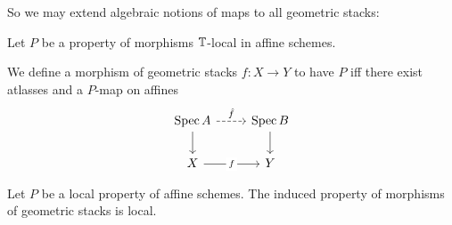 So we may extend algebraic notions of maps to all geometric stacks:
\begin{definition}
	Let $P$ be a property of morphisms $\mathbb{T}$-local in affine schemes.
	
	We define a morphism of geometric stacks $f : X \to Y$ to have $P$ iff
	there exist atlasses and a $P$-map on affines 
	\[\begin{tikzcd}
		{\Spec A} & {\Spec B} \\
		X & Y
		\arrow["{\hat f}", dashed, from=1-1, to=1-2]
		\arrow[from=1-1, to=2-1]
		\arrow[from=1-2, to=2-2]
		\arrow["f"{description}, from=2-1, to=2-2]
	\end{tikzcd}\]	
\end{definition}
\begin{lemma}
	Let $P$  be a local property of affine schemes. The induced property of morphisms of geometric stacks is local.
\end{lemma}
